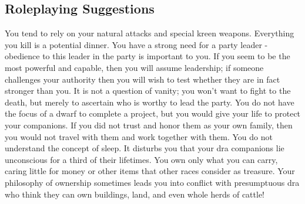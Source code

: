 \subsection{Roleplaying Suggestions}
You tend to rely on your natural attacks and special kreen weapons. Everything you kill is a potential dinner. You have a strong need for a party leader - obedience to this leader in the party is important to you. If you seem to be the most powerful and capable, then you will assume leadership; if someone challenges your authority then you will wish to test whether they are in fact stronger than you. It is not a question of vanity; you won't want to fight to the death, but merely to ascertain who is worthy to lead the party. You do not have the focus of a dwarf to complete a project, but you would give your life to protect your companions. If you did not trust and honor them as your own family, then you would not travel with them and work together with them. You do not understand the concept of sleep. It disturbs you that your dra companions lie unconscious for a third of their lifetimes. You own only what you can carry, caring little for money or other items that other races consider as treasure. Your philosophy of ownership sometimes leads you into conflict with presumptuous dra who think they can own buildings, land, and even whole herds of cattle!




